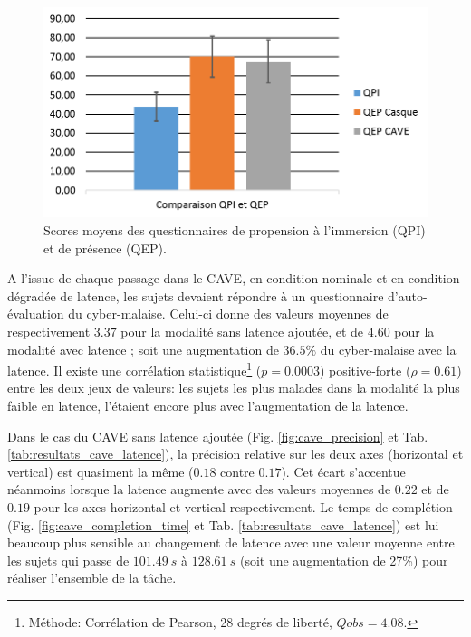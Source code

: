 	\begin{figure}
		\centering
		\includegraphics[width=0.8\linewidth]{Figures/ITQvPQ.png}
		\caption{Scores moyens des questionnaires de propension à l'immersion (QPI) et de présence (QEP).}
		\label{fig:itq_pq}
	\end{figure}
	
	\par A l'issue de chaque passage dans le CAVE, en condition nominale et en condition dégradée de latence, les sujets devaient répondre à un questionnaire d'auto-évaluation du cyber-malaise. Celui-ci donne des valeurs moyennes de respectivement $3.37$ pour la modalité sans latence ajoutée, et de $4.60$ pour la modalité avec latence ; soit une augmentation de $36.5\%$ du cyber-malaise avec la latence. Il existe une corrélation statistique\footnote{Méthode: Corrélation de Pearson, 28 degrés de liberté, $Qobs = 4.08$.} ($p = 0.0003$) positive-forte ($\rho = 0.61$) entre les deux jeux de valeurs: les sujets les plus malades dans la modalité la plus faible en latence, l'étaient encore plus avec l'augmentation de la latence.
	
	\par Dans le cas du CAVE sans latence ajoutée (Fig. \ref{fig:cave_precision} et Tab. \ref{tab:resultats_cave_latence}), la précision relative sur les deux axes (horizontal et vertical) est quasiment la même ($0.18$ contre $0.17$). Cet écart s'accentue néanmoins lorsque la latence augmente avec des valeurs moyennes de $0.22$ et de $0.19$ pour les axes horizontal et vertical respectivement. Le temps de complétion (Fig. \ref{fig:cave_completion_time} et Tab. \ref{tab:resultats_cave_latence}) est lui beaucoup plus sensible au changement de latence avec une valeur moyenne entre les sujets qui passe de $101.49~s$ à $128.61~s$ (soit une augmentation de 27\%) pour réaliser l'ensemble de la tâche.

